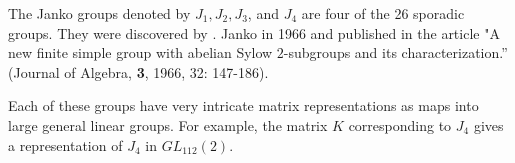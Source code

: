 \documentclass[12pt]{article}
\begin{document}

The Janko groups denoted by $J_1, J_2, J_3$, and $J_4$ are four of the 26 sporadic groups.  They were discovered by . Janko in 1966 and published  in the article "A new finite simple group with abelian Sylow $2$-subgroups and its characterization.''  (Journal of Algebra, \textbf{3}, 1966, 32: 147-186).

Each of these groups have very intricate matrix representations as maps into large general linear groups.  For example, the matrix $K$ corresponding to $J_4$ gives a representation of $J_4$ in $GL_{112}(2)$.
\end{document}
